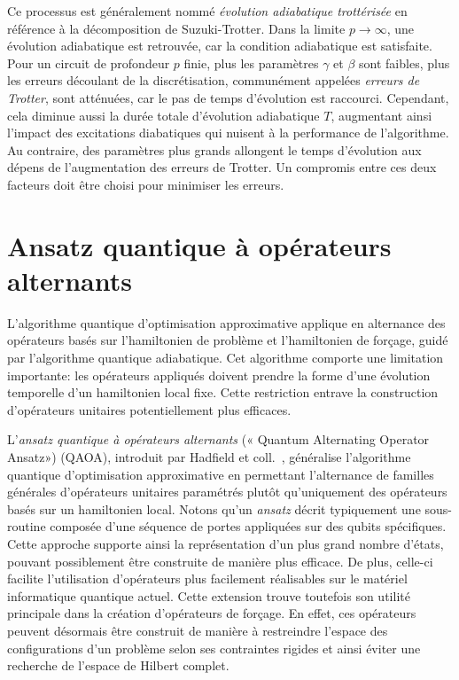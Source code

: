  Ce processus est généralement nommé \textit{évolution adiabatique trottérisée} en référence à la décomposition de Suzuki-Trotter. Dans la limite $p \to \infty$, une évolution adiabatique est retrouvée, car la condition adiabatique est satisfaite. Pour un circuit de profondeur $p$ finie, plus les paramètres $\gamma$ et $\beta$ sont faibles, plus les erreurs découlant de la discrétisation, communément appelées \textit{erreurs de Trotter}, sont atténuées, car le pas de temps d'évolution est raccourci. Cependant, cela diminue aussi la durée totale d'évolution adiabatique $T$, augmentant ainsi l'impact des excitations diabatiques qui nuisent à la performance de l'algorithme. Au contraire, des paramètres plus grands allongent le temps d'évolution aux dépens de l'augmentation des erreurs de Trotter. Un compromis entre ces deux facteurs doit être choisi pour minimiser les erreurs.


\section{Ansatz quantique à opérateurs alternants}
\label{sec:ansatz-quantique-a-operateurs-alternants}

L'algorithme quantique d'optimisation approximative applique en alternance des opérateurs basés sur l'hamiltonien de problème et l'hamiltonien de forçage, guidé par l'algorithme quantique adiabatique. Cet algorithme comporte une limitation importante: les opérateurs appliqués doivent prendre la forme d'une évolution temporelle d'un hamiltonien local fixe. Cette restriction entrave la construction d'opérateurs unitaires potentiellement plus efficaces.

L'\textit{ansatz quantique à opérateurs alternants} (« Quantum Alternating Operator Ansatz») (QAOA), introduit par Hadfield et coll.~\cite{hadfieldQuantumApproximateOptimization2019}, généralise l'algorithme quantique d'optimisation approximative en permettant l'alternance de familles générales d'opérateurs unitaires paramétrés plutôt qu'uniquement des opérateurs basés sur un hamiltonien local. Notons qu'un \textit{ansatz} décrit typiquement une sous-routine composée d'une séquence de portes appliquées sur des qubits spécifiques. Cette approche supporte ainsi la représentation d'un plus grand nombre d'états, pouvant possiblement être construite de manière plus efficace. De plus, celle-ci facilite l'utilisation d'opérateurs plus facilement réalisables sur le matériel informatique quantique actuel. Cette extension trouve toutefois son utilité principale dans la création d'opérateurs de forçage. En effet, ces opérateurs peuvent désormais être construit de manière à restreindre l'espace des configurations d'un problème selon ses contraintes rigides et ainsi éviter une recherche de l'espace de Hilbert complet. 


